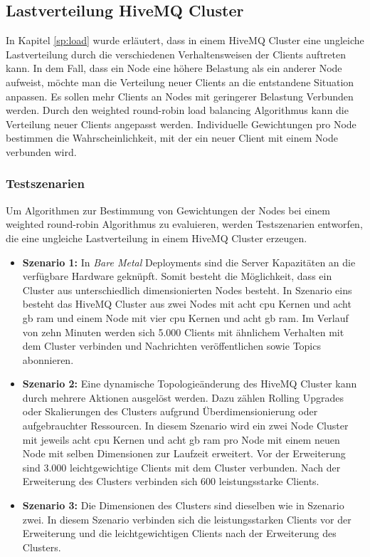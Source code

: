 \subsection{Lastverteilung HiveMQ Cluster} \label{ss:load-distribution}
In Kapitel \ref{sp:load} wurde erläutert, dass in einem HiveMQ Cluster eine ungleiche Lastverteilung durch die verschiedenen Verhaltensweisen der Clients auftreten kann.
In dem Fall, dass ein Node eine höhere Belastung als ein anderer Node aufweist, möchte man die Verteilung neuer Clients an die entstandene Situation anpassen. Es sollen mehr Clients an Nodes mit geringerer Belastung Verbunden werden.
Durch den weighted round-robin load balancing Algorithmus kann die Verteilung neuer Clients angepasst werden. Individuelle Gewichtungen pro Node bestimmen die Wahrscheinlichkeit, mit der ein neuer Client mit einem Node verbunden wird.

\subsubsection{Testszenarien} \label{ss:test}
Um Algorithmen zur Bestimmung von Gewichtungen der Nodes bei einem weighted round-robin Algorithmus zu evaluieren, werden Testszenarien entworfen, die eine ungleiche Lastverteilung in einem HiveMQ Cluster erzeugen.

\begin{itemize}
  \item \textbf{Szenario 1:} In \textit{Bare Metal} Deployments sind die Server Kapazitäten an die verfügbare Hardware geknüpft. Somit besteht die Möglichkeit, dass ein Cluster aus unterschiedlich dimensionierten Nodes besteht. In Szenario eins besteht das HiveMQ Cluster aus zwei Nodes mit acht \ac{cpu} Kernen und acht \ac{gb} \ac{ram} und einem Node mit vier \ac{cpu} Kernen und acht \ac{gb} \ac{ram}. Im Verlauf von zehn Minuten werden sich 5.000 Clients mit ähnlichem Verhalten mit dem Cluster verbinden und Nachrichten veröffentlichen sowie Topics abonnieren.
  \item \textbf{Szenario 2:} Eine dynamische Topologieänderung des HiveMQ Cluster kann durch mehrere Aktionen ausgelöst werden. Dazu zählen Rolling Upgrades oder Skalierungen des Clusters aufgrund Überdimensionierung oder aufgebrauchter Ressourcen. In diesem Szenario wird ein zwei Node Cluster mit jeweils acht \ac{cpu} Kernen und acht \ac{gb} \ac{ram} pro Node mit einem neuen Node mit selben Dimensionen zur Laufzeit erweitert. Vor der Erweiterung sind 3.000 leichtgewichtige Clients mit dem Cluster verbunden. Nach der Erweiterung des Clusters verbinden sich 600 leistungsstarke Clients.
  \item \textbf{Szenario 3:} Die Dimensionen des Clusters sind dieselben wie in Szenario zwei. In diesem Szenario verbinden sich die leistungsstarken Clients vor der Erweiterung und die leichtgewichtigen Clients nach der Erweiterung des Clusters.
\end{itemize}

